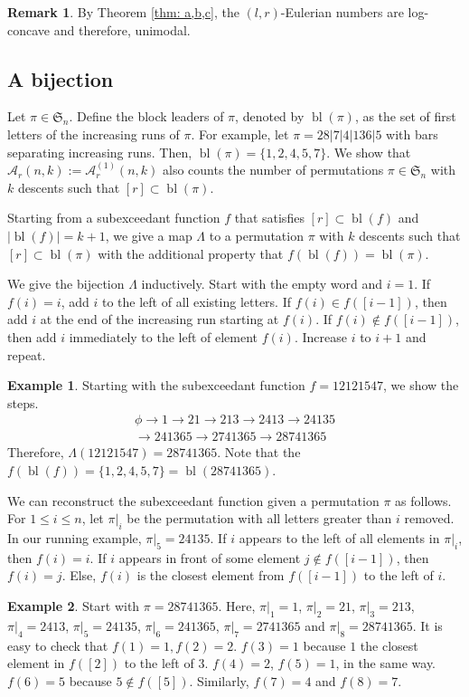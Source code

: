 \documentclass{article}
\newcommand{\SSS}{\mathfrak{S}}
\newcommand{\eul}{\mathcal{A}}
\DeclareMathOperator{\bl}{bl}
\theoremstyle{definition}
\newtheorem*{remark}{Remark}
\newtheorem{example}{Example}
\numberwithin{equation}{section}
\begin{document}
\begin{remark}
      By Theorem \ref{thm: a,b,c}, the $(l,r)$-Eulerian numbers are log-concave and therefore, unimodal.    
\end{remark}

\subsection{A bijection}
Let $\pi\in \SSS_n$. 
Define the block leaders of $\pi$, denoted by $\bl(\pi)$, as the set of first letters of the increasing runs of $\pi$. For example, let $\pi=28|7|4|136|5$ with bars separating increasing runs. Then, $\bl(\pi)=\{ 1,2,4,5,7 \}$. 
We show that $\eul_r(n,k):=\eul^{(1)}_r(n,k)$ also counts the number of permutations $\pi\in \SSS_n$ with $k$ descents such that $[r]\subset \bl(\pi)$.

Starting from a subexceedant function $f$ that satisfies $[r]\subset \bl(f)$ and $|\bl(f)|=k+1$, we give a map $\Lambda$ to a permutation $\pi$ with $k$ descents such that $[r]\subset \bl(\pi)$ with the additional property that $f(\bl(f))=\bl(\pi)$.

We give the bijection $\Lambda$ inductively. Start with the empty word and $i=1$. If $f(i)=i$, add $i$ to the left of all existing letters. If $f(i)\in f([i-1])$, then add $i$ at the end of the increasing run starting at $f(i)$. If $f(i)\notin f([i-1])$, then add $i$ immediately to the left of element $f(i)$. Increase $i$ to $i+1$ and repeat.

\begin{example}
    Starting with the subexceedant function $f=12121547$, we show the steps.
    \begin{eqnarray*}
        \phi\rightarrow 1 \rightarrow 21\rightarrow 213\rightarrow 2413\rightarrow 24135\\
        \rightarrow 241365 \rightarrow 2741365\rightarrow 28741365
    \end{eqnarray*}
    Therefore, $\Lambda(12121547)=28741365$.
    Note that the $f(\bl(f))=\{ 1,2,4,5,7 \} =\bl(28741365)$.
\end{example}

We can reconstruct the subexceedant function given a permutation $\pi$ as follows. For $1\le i\le n$, let $\pi|_i$ be the permutation with all letters greater than $i$ removed. In our running example, $\pi|_5=24135$.
If $i$ appears to the left of all elements in $\pi|_{i}$, then $f(i)=i$. If $i$ appears in front of some element $j\notin f([i-1])$, then $f(i)=j$. Else, $f(i)$ is the closest element from $f([i-1])$ to the left of $i$. 
\begin{example}
    Start with $\pi=28741365$. Here, $\pi|_1=1$, $\pi|_2=21$, $\pi|_3=213$, $\pi|_4=2413$, $\pi|_5=24135$, $\pi|_6=241365$, $\pi|_{7}=2741365$ and $\pi|_8=28741365$. 
    It is easy to check that $f(1)=1,f(2)=2$. $f(3)=1$ because $1$ the closest element in $f([2])$ to the left of $3$. $f(4)=2$, $f(5)=1$, in the same way. $f(6)=5$ because $5\notin f([5])$. Similarly, $f(7)=4$ and $f(8)=7$.
\end{example}
\end{document}
